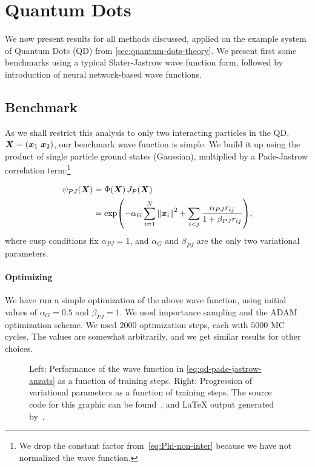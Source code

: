 \documentclass[Thesis.tex]{subfiles}
\begin{document}
\chapter{Quantum Dots}
\label{chp:quantum-dots}

We now present results for all methods discussed, applied on the example system
of Quantum Dots (QD) from \cref{sec:quantum-dots-theory}. We present first some
benchmarks using a typical Slater-Jastrow wave function form, followed by
introduction of neural network-based wave functions.

\section{Benchmark}

As we shall restrict this analysis to only two interacting particles in the QD,
$\bm{X} = (\bm{x}_1\ \bm{x}_2)$, our benchmark wave function is simple. We build
it up using the product of single particle ground states (Gaussian), multiplied
by a Pade-Jastrow correlation term:\footnote{We drop the constant factor from~\cref{eq:Phi-non-inter} because we have not normalized the wave function.}

\begin{align}
  \label{eq:qd-pade-jastrow-anzats}
  \psi_{PJ}(\bm{X}) &= \Phi(\bm{X}) \,J_P(\bm{X})\\
  &= \exp(-\alpha_G\sum_{i=1}^N \norm{\bm{x}_i}^2 + \sum_{i < j} \frac{\alpha_{PJ}
    r_{ij}}{1 + \beta_{PJ} r_{ij}}),
\end{align}
where cusp conditions fix $\alpha_{PJ} = 1$, and $\alpha_G$ and $\beta_{PJ}$
are the only two variational parameters.

\subsubsection{Optimizing}

We have run a simple optimization of the above wave function, using initial
values of $\alpha_G = 0.5$ and $\beta_{PJ} = 1$. We used importance sampling and the
ADAM optimization scheme. We used $\num{2000}$ optimization steps, each with
$\num{5000}$ MC cycles. The values are somewhat arbitrarily, and we get
similar results for other choices.

\begin{figure}[h]
   \centering
    \resizebox{\linewidth}{!}{%
        
    }
    \caption{\label{fig:QD-benchmark-pade-jastrow-training}Left: Performance of the
      wave function in \cref{eq:qd-pade-jastrow-anzats} as a function of
      training steps. Right: Progression of variational parameters as a function
      of training steps. The source code for this graphic can be found~\cite[TODO: Add
    path]{MS-thesis-repository}, and \LaTeX{} output generated
    by~\cite{nico_schlomer_2018_1173090}.}
\end{figure}
\end{document}
